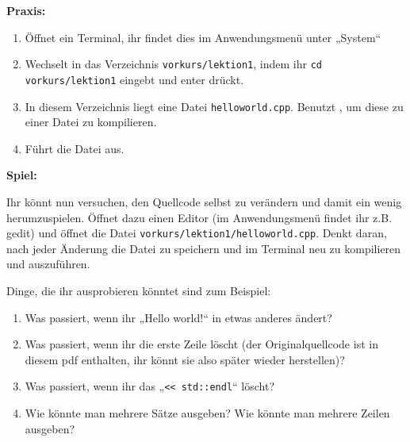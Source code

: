 \begin{center}
\end{center}

\textbf{Praxis:}
\begin{enumerate}
    \item Öffnet ein Terminal, ihr findet dies im Anwendungsmenü unter „System“
    \item Wechselt in das Verzeichnis \texttt{vorkurs/lektion1}, indem ihr
        \texttt{cd vorkurs/lektion1} eingebt und enter drückt.
    \item In diesem Verzeichnis liegt eine Datei \texttt{helloworld.cpp}.
        Benutzt , um diese zu einer Datei  zu
        kompilieren.
    \item Führt die Datei  aus.
\end{enumerate}


\textbf{Spiel:}

Ihr könnt nun versuchen, den Quellcode selbst zu verändern und damit ein wenig
herumzuspielen. Öffnet dazu einen Editor (im Anwendungsmenü findet ihr z.B.
gedit) und öffnet die Datei \texttt{vorkurs/lektion1/helloworld.cpp}. Denkt
daran, nach jeder Änderung die Datei zu speichern und im Terminal neu zu
kompilieren und auszuführen.

Dinge, die ihr ausprobieren könntet sind zum Beispiel:
\begin{enumerate}
    \item Was passiert, wenn ihr „Hello world!“ in etwas anderes ändert?
    \item Was passiert, wenn ihr die erste Zeile löscht (der Originalquellcode
        ist in diesem pdf enthalten, ihr könnt sie also später wieder
        herstellen)?
    \item Was passiert, wenn ihr das „\verb|<< std::endl|“ löscht?
    \item Wie könnte man mehrere Sätze ausgeben? Wie könnte man mehrere Zeilen
        ausgeben?
\end{enumerate}
